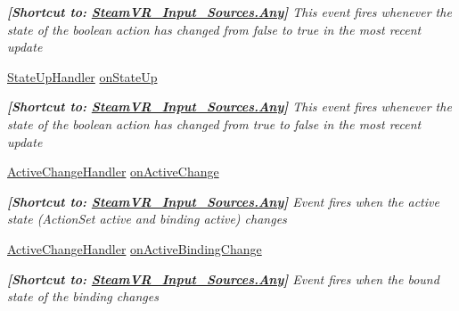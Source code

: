 \begin{DoxyCompactItemize}
\begin{DoxyCompactList}\small\item\em {\bfseries{\mbox{[}Shortcut to\+: \mbox{\hyperlink{namespace_valve_1_1_v_r_a82e5bf501cc3aa155444ee3f0662853faed36a1ef76a59ee3f15180e0441188ad}{Steam\+V\+R\+\_\+\+Input\+\_\+\+Sources.\+Any}}\mbox{]}}} This event fires whenever the state of the boolean action has changed from false to true in the most recent update \end{DoxyCompactList}\item 
\mbox{\hyperlink{class_valve_1_1_v_r_1_1_steam_v_r___action___boolean_a87ebada25dac6016557c3b81e6324b90}{State\+Up\+Handler}} \mbox{\hyperlink{class_valve_1_1_v_r_1_1_steam_v_r___action___boolean_a3516cf7cfb1a60d2e35cb33766f7ee9b}{on\+State\+Up}}
\begin{DoxyCompactList}\small\item\em {\bfseries{\mbox{[}Shortcut to\+: \mbox{\hyperlink{namespace_valve_1_1_v_r_a82e5bf501cc3aa155444ee3f0662853faed36a1ef76a59ee3f15180e0441188ad}{Steam\+V\+R\+\_\+\+Input\+\_\+\+Sources.\+Any}}\mbox{]}}} This event fires whenever the state of the boolean action has changed from true to false in the most recent update \end{DoxyCompactList}\item 
\mbox{\hyperlink{class_valve_1_1_v_r_1_1_steam_v_r___action___boolean_af9f3044d5e4868485945b70d907c6bbb}{Active\+Change\+Handler}} \mbox{\hyperlink{class_valve_1_1_v_r_1_1_steam_v_r___action___boolean_a6a6a7e453cfd9ae522237e818304410e}{on\+Active\+Change}}
\begin{DoxyCompactList}\small\item\em {\bfseries{\mbox{[}Shortcut to\+: \mbox{\hyperlink{namespace_valve_1_1_v_r_a82e5bf501cc3aa155444ee3f0662853faed36a1ef76a59ee3f15180e0441188ad}{Steam\+V\+R\+\_\+\+Input\+\_\+\+Sources.\+Any}}\mbox{]}}} Event fires when the active state (Action\+Set active and binding active) changes \end{DoxyCompactList}\item 
\mbox{\hyperlink{class_valve_1_1_v_r_1_1_steam_v_r___action___boolean_af9f3044d5e4868485945b70d907c6bbb}{Active\+Change\+Handler}} \mbox{\hyperlink{class_valve_1_1_v_r_1_1_steam_v_r___action___boolean_a8037fe573d3db4ff82e02447d588b7f6}{on\+Active\+Binding\+Change}}
\begin{DoxyCompactList}\small\item\em {\bfseries{\mbox{[}Shortcut to\+: \mbox{\hyperlink{namespace_valve_1_1_v_r_a82e5bf501cc3aa155444ee3f0662853faed36a1ef76a59ee3f15180e0441188ad}{Steam\+V\+R\+\_\+\+Input\+\_\+\+Sources.\+Any}}\mbox{]}}} Event fires when the bound state of the binding changes \end{DoxyCompactList}\item 

\end{DoxyCompactItemize}
